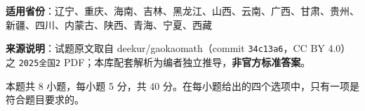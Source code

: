 

\begin{gknotice}
\textbf{适用省份}：辽宁、重庆、海南、吉林、黑龙江、山西、云南、广西、甘肃、贵州、新疆、四川、内蒙古、陕西、青海、宁夏、西藏

\textbf{来源说明}：试题原文取自 deekur/gaokaomath（commit \texttt{34c13a6}，CC BY 4.0）之 \texttt{2025全国2} PDF；本库配套解析为编者独立推导，\textbf{非官方标准答案}。
\end{gknotice}

\par\medskip


\begin{gktip}
本题共 8 小题，每小题 5 分，共 40 分。在每小题给出的四个选项中，只有一项是符合题目要求的。
\end{gktip}

